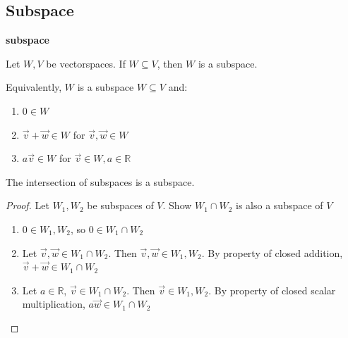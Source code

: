 \documentclass[11pt]{article}
\begin{document}
\subsection{Subspace}
\label{sec:orgheadline2}
\begin{definition}
\textbf{subspace}

Let \(W,V\) be vectorspaces.  If \(W \subseteq V\), then \(W\) is a subspace.

Equivalently, \(W\) is a subspace \(W \subseteq V\) and:
\begin{enumerate}
\item \(0 \in W\)
\item \(\overrightarrow{v} + \overrightarrow{w} \in W\) for \(\overrightarrow{v},\overrightarrow{w} \in W\)
\item \(a \overrightarrow{v} \in W\) for \(\overrightarrow{v} \in W, a \in \mathbb{R}\)
\end{enumerate}
\end{definition}

\begin{theorem}
The intersection of subspaces is a subspace.
\end{theorem}
\begin{proof}
Let \(W_1, W_2\) be subspaces of \(V\).  Show \(W_1 \cap W_2\) is also a subspace of \(V\)
\begin{enumerate}
\item \(0 \in W_1, W_2\), so \(0 \in W_1 \cap W_2\)
\item Let \(\overrightarrow{v}, \overrightarrow{w} \in W_1 \cap W_2\).  Then \(\overrightarrow{v}, \overrightarrow{w} \in W_1, W_2\).  By property of closed addition, \(\overrightarrow{v} + \overrightarrow{w} \in W_1 \cap W_2\)
\item Let \(a \in \mathbb{R}\), \(\overrightarrow{v} \in W_1 \cap W_2\).  Then \(\overrightarrow{v} \in W_1, W_2\).  By property of closed scalar multiplication, \(a \overrightarrow{w} \in W_1 \cap W_2\)
\end{enumerate}
\end{proof}
\end{document}
